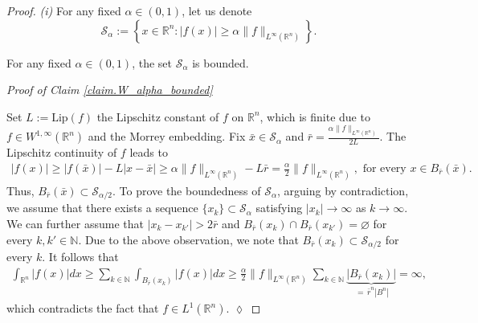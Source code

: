 \documentclass[10pt,a4paper]{amsart}
\newcommand{\R}{\mathbb{R}}
\newcommand{\Sset}{\mathscr S}
\begin{document}
\begin{proof}
    \textit{(i)} 
    For any fixed $\alpha \in (0, 1)$, let us denote    
    \[
        \Sset_\alpha := \left\{ x \in \R^n : |f(x)| \geq \alpha \| f \|_{L^\infty(\R^n)} \right\}.
    \]
    
    \begin{claim}\label{claim.W_alpha_bounded}
    		For any fixed $\alpha \in (0, 1)$, the set $\Sset_\alpha$ is bounded.
    \end{claim}
	    
    \medskip
    
    \textit{Proof of Claim \ref{claim.W_alpha_bounded}}
    
	\medskip
	
    Set $L := \mathrm{Lip}(f)$ the Lipschitz constant of $f$ on $\R^n$, which is finite due to $f \in W^{1, \infty}(\R^n)$ and the Morrey embedding.
    Fix $\bar x \in \Sset_\alpha$ and $\bar r = \frac{\alpha \| f \|_{L^\infty(\R^n)}}{2L}$.
   The Lipschitz continuity of $f$ leads to
   	\begin{align*}
   		|f(x)| \geq |f(\bar x)| - L |x - \bar x| \geq \alpha \| f \|_{L^\infty (\R^n)} - L \bar r = \frac{\alpha}{2} \| f \|_{L^\infty(\R^n)}, \text{ for every } x \in B_{\bar r}(\bar x).
   	\end{align*}
	Thus,  $B_{\bar r}(\bar x) \subset \Sset_{\alpha/2}$.
    To prove the boundedness of $\Sset_\alpha$, arguing by contradiction, we assume that there exists a sequence $\{ x_k \} \subset \Sset_\alpha$ satisfying $|x_k| \to \infty$ as $k \to \infty$.
    We can further assume that $|x_k - x_{k'}| > 2\bar r$ and $B_{\bar r}(x_k) \cap B_{\bar r}(x_{k'}) = \varnothing$ for every $k, k' \in \mathbb{N}$.
	Due to the above observation, we note that $B_{\bar r}(x_k) \subset \Sset_{\alpha/2}$ for every $k$.
	It follows that
	\begin{align*}
		\int_{\R^n} |f(x)| dx \geq \sum_{k \in \mathbb N} \int_{B_{\bar r}(x_k)} |f(x)| dx \geq \frac{\alpha}{2} \| f \|_{L^\infty(\R^n)} \sum_{k \in \mathbb N} \underbrace{|B_{\bar r}(x_k)|}_{ \, = \, \bar r^n |B^n|} = \infty,
	\end{align*}
	which contradicts the fact that $f \in L^1(\R^n)$. \hfill $\lozenge$	
	
	\medskip
	

\end{proof}
\end{document}
